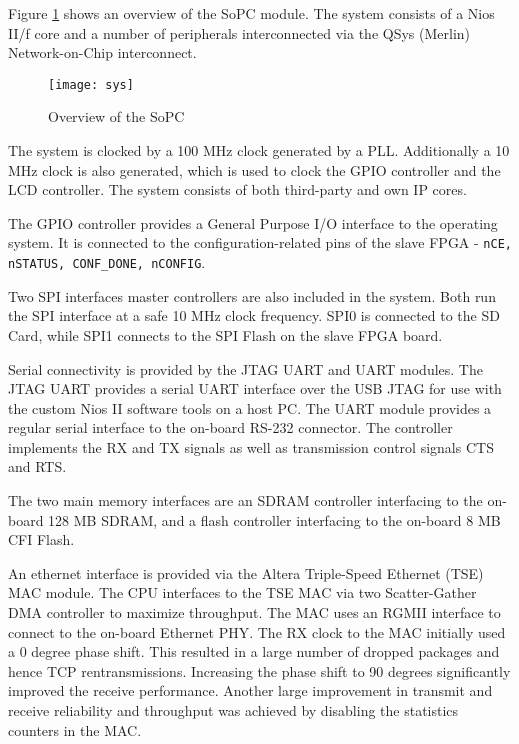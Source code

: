 Figure \ref{figure:sopc_overview} shows an overview of the SoPC module. The system consists of a Nios II/f core
and a number of peripherals interconnected via the QSys (Merlin) Network-on-Chip
interconnect.

\begin{figure}[h!]
\begin{center}
\texttt{[image: sys]}
\caption{Overview of the SoPC}
\label{figure:sopc_overview}
\end{center}
\end{figure}

The system is clocked by a 100 MHz clock generated by a PLL. Additionally a 10 MHz clock
is also generated, which is used to clock the GPIO controller and the LCD controller. The
system consists of both third-party and own IP cores.

The GPIO controller provides a General Purpose I/O interface to the operating system. It
is connected to the configuration-related pins of the slave FPGA - \texttt{nCE, nSTATUS,
CONF\_DONE, nCONFIG}.

Two SPI interfaces master controllers are also included in the system. Both run the SPI
interface at a safe 10 MHz clock frequency. SPI0 is connected to the SD Card, while SPI1
connects to the SPI Flash on the slave FPGA board.

Serial connectivity is provided by the JTAG UART and UART modules. The JTAG UART
provides a serial UART interface over the USB JTAG for use with the custom Nios II software
tools on a host PC. The UART module provides a regular serial interface to the on-board
RS-232 connector. The controller implements the RX and TX signals as well as transmission control
signals CTS and RTS.

The two main memory interfaces are an SDRAM controller interfacing to the on-board 128 MB
SDRAM, and a flash controller interfacing to the on-board 8 MB CFI Flash.

An ethernet interface is provided via the Altera Triple-Speed Ethernet (TSE) MAC module. The
CPU interfaces to the TSE MAC via two Scatter-Gather DMA controller to maximize throughput. The
MAC uses an RGMII interface to connect to the on-board Ethernet PHY. The RX clock to the MAC
initially used a 0 degree phase shift. This resulted in a large number of dropped packages and
hence TCP rentransmissions. Increasing the phase shift to 90 degrees significantly improved
the receive performance. Another large improvement in transmit and receive reliability and
throughput was achieved by disabling the statistics counters in the MAC.

